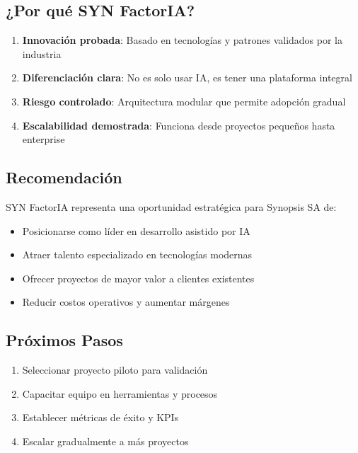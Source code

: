 \documentclass[12pt,a4paper,spanish]{article}
\begin{document}
\subsection{¿Por qué SYN FactorIA?}

\begin{enumerate}
    \item \textbf{Innovación probada}: Basado en tecnologías y patrones validados por la industria
    \item \textbf{Diferenciación clara}: No es solo usar IA, es tener una plataforma integral
    \item \textbf{Riesgo controlado}: Arquitectura modular que permite adopción gradual
    \item \textbf{Escalabilidad demostrada}: Funciona desde proyectos pequeños hasta enterprise
\end{enumerate}

\subsection{Recomendación}

SYN FactorIA representa una oportunidad estratégica para Synopsis SA de:

\begin{itemize}
    \item Posicionarse como líder en desarrollo asistido por IA
    \item Atraer talento especializado en tecnologías modernas
    \item Ofrecer proyectos de mayor valor a clientes existentes
    \item Reducir costos operativos y aumentar márgenes
\end{itemize}

\subsection{Próximos Pasos}

\begin{enumerate}
    \item Seleccionar proyecto piloto para validación
    \item Capacitar equipo en herramientas y procesos
    \item Establecer métricas de éxito y KPIs
    \item Escalar gradualmente a más proyectos
\end{enumerate}

\newpage
\end{document}
